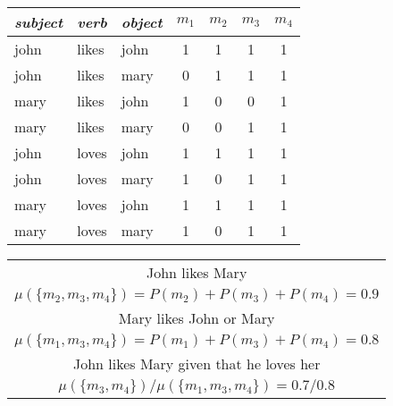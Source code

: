 \documentclass[11pt]{article}
\theoremstyle{definition}
\begin{document}
\begin{table*}
  \parbox{.45\linewidth}{
    \centering
    \begin{tabular}{|l|l|l||c|c|c|c|}
      \hline
      \emph{subject} & \emph{verb} & \emph{object} & $m_1$ & $m_2$ & $m_3$ & $m_4$\\
      \hline
      john & likes & john & 1 & 1 & 1 & 1\\
      john & likes & mary & 0 & 1 & 1 & 1\\
      mary & likes & john & 1 & 0 & 0 & 1\\
      mary & likes & mary & 0 & 0 & 1 & 1\\
      john & loves & john & 1 & 1 & 1 & 1\\
      john & loves & mary & 1 & 0 & 1 & 1\\
      mary & loves & john & 1 & 1 & 1 & 1\\
      mary & loves & mary & 1 & 0 & 1 & 1\\
      \hline
    \end{tabular}
    \caption{Four possible models describing relationships between John
      and Mary.}
    \label{table:models}
  }
  \hfill
\parbox{.45\linewidth}{
  \centering
  \def\arraystretch{1.5}%
  \begin{tabular}{c}      
    John likes Mary \\ $\mu(\{m_2, m_3, m_4\}) =
    P(m_2) + P(m_3) + P(m_4) = 0.9$\\
    \hline
    Mary likes John or Mary \\ $\mu(\{m_1, m_3, m_4\}) =
    P(m_1) + P(m_3) + P(m_4) = 0.8$\\
    \hline
    John likes Mary given that he loves her\\
    $\mu(\{m_3, m_4\})/\mu(\{m_1, m_3, m_4\}) = 0.7/0.8$\\
  \end{tabular}
  \caption{Statements and their probabilities given the models in
    Table \ref{table:models}.}
  \label{table:statements}
}
\end{table*}

\end{document}
